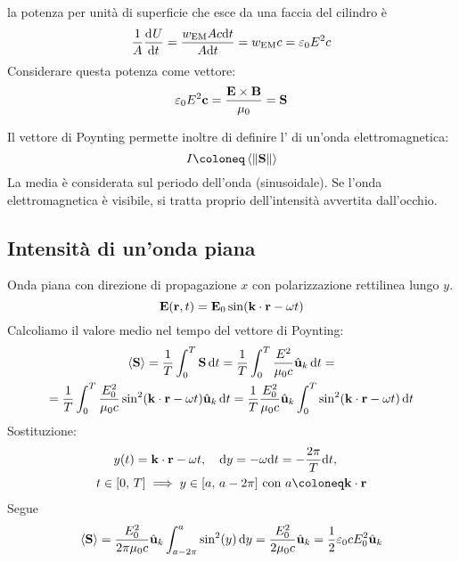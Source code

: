 la potenza per unità di superficie che esce da una faccia del cilindro è
\begin{equation}
    \frac{1}{A} \der[U]{t} = \frac{w\EM A c \de t}{A \de t} = w\EM c = \eps_0 E^2 c
\end{equation}
Considerare questa potenza come vettore:
\begin{equation}
    \varepsilon_0 E^2 \mathbf{c} = \frac{\mathbf{E} \times \mathbf{B}}{\mu_0} = \mathbf{S}
\end{equation}

Il vettore di Poynting permette inoltre di definire l' di un'onda elettromagnetica:
\begin{equation}
    I \coloneq \avg{\norm{\poy}}
\end{equation}
La media è considerata sul periodo dell'onda (sinusoidale).
Se l'onda elettromagnetica è visibile, si tratta proprio dell'intensità avvertita dall'occhio.

\subsection{Intensità di un'onda piana}

Onda piana con direzione di propagazione $x$ con polarizzazione rettilinea lungo $y$.
\begin{equation}
    \mathbf{E}(\mathbf{r}, t) = \mathbf{E}_0 \sin(\mathbf{k} \cdot \mathbf{r} - \omega t)
\end{equation}
Calcoliamo il valore medio nel tempo del vettore di Poynting:
\begin{equation}
\begin{gathered}
    \left\langle \mathbf{S} \right\rangle = \frac{1}{T} \int_0^T \mathbf{S} \, \mathrm{d} t
    = \frac{1}{T} \int_0^T \frac{E^2}{\mu_0 c} \hat{\mathbf{u}}_{k} \, \mathrm{d} t = \\
    = \frac{1}{T} \int_0^T \frac{E_0^2}{\mu_0 c} \sin^2(\mathbf{k} \cdot \mathbf{r} - \omega t) \hat{\mathbf{u}}_{k} \, \mathrm{d} t
    = \frac{1}{T} \frac{E_0^2}{\mu_0 c} \hat{\mathbf{u}}_{k} \int_0^T \sin^2(\mathbf{k} \cdot \mathbf{r} - \omega t) \, \mathrm{d} t
\end{gathered}
\end{equation}
Sostituzione:
\begin{equation}
\begin{gathered}
    y(t) = \vt{k} \cdot \p - \omega t, \quad
    \de y = -\omega \de t = -\frac{2 \pi}{T} \de t, \quad \\
    t \in [0, \, T] \implies y \in [a, \, a - 2\pi]
    \text{ con } a \coloneq \vt{k} \cdot \p
\end{gathered}
\end{equation}
Segue
\begin{gather}
    \left\langle \mathbf{S} \right\rangle = \frac{E_0^2}{2 \pi \mu_0 c} \hat{\mathbf{u}}_{k} \int_{a - 2\pi}^a \sin^2(y) \, \mathrm{d} y
    = \frac{E_0^2}{2 \mu_0 c} \hat{\mathbf{u}}_{k}
    = \frac{1}{2} \varepsilon_0 c E_0^2 \hat{\mathbf{u}}_{k}
\end{gather}

